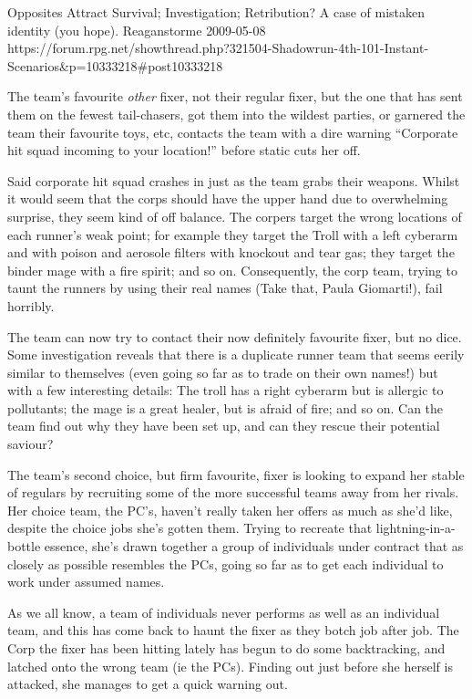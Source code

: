 \begin{scenario}{Opposites Attract}
	{Survival; Investigation; Retribution?}
	{A case of mistaken identity (you hope).}
	{Reaganstorme}
	{2009-05-08}
	{https://forum.rpg.net/showthread.php?321504-Shadowrun-4th-101-Instant-Scenarios\&p=10333218#post10333218}

 The team's favourite \textit{other} fixer, not their regular fixer, but the one that has sent them on the fewest tail-chasers, got them into the wildest parties, or garnered the team their favourite toys, etc, contacts the team with a dire warning ``Corporate hit squad incoming to your location!'' before static cuts her off.

\synopsis Said corporate hit squad crashes in just as the team grabs their weapons. Whilst it would seem that the corps should have the upper hand due to overwhelming surprise, they seem kind of off balance. The corpers target the wrong locations of each runner's weak point; for example they target the Troll with a left cyberarm and with poison and aerosole filters with knockout and tear gas; they target the binder mage with a fire spirit; and so on. Consequently, the corp team, trying to taunt the runners by using their real names (Take that, Paula Giomarti!), fail horribly.

The team can now try to contact their now definitely favourite fixer, but no dice. Some investigation reveals that there is a duplicate runner team that seems eerily similar to themselves (even going so far as to trade on their own names!) but with a few interesting details: The troll has a right cyberarm but is allergic to pollutants; the mage is a great healer, but is afraid of fire; and so on. Can the team find out why they have been set up, and can they rescue their potential saviour?

\notes The team's second choice, but firm favourite, fixer is looking to expand her stable of regulars by recruiting some of the more successful teams away from her rivals. Her choice team, the PC's, haven't really taken her offers as much as she'd like, despite the choice jobs she's gotten them. Trying to recreate that lightning-in-a-bottle essence, she's drawn together a group of individuals under contract that as closely as possible resembles the PCs, going so far as to get each individual to work under assumed names.

As we all know, a team of individuals never performs as well as an individual team, and this has come back to haunt the fixer as they botch job after job. The Corp the fixer has been hitting lately has begun to do some backtracking, and latched onto the wrong team (ie the PCs). Finding out just before she herself is attacked, she manages to get a quick warning out.


\end{scenario}
